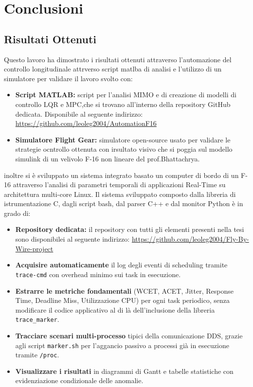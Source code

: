 \chapter{Conclusioni}
\label{ch:conclusioni}

\section{Risultati Ottenuti}
Questo lavoro ha dimostrato i risultati ottenuti attraverso l'automazione del controllo longitudinale attrverso script matlba di analisi e l'utilizzo di un simulatore per validare il lavoro svolto con:


\begin{itemize}
	
	\item \textbf{Script MATLAB:} script per l'analisi MIMO e di creazione di modelli di controllo LQR e MPC,che si trovano all'interno della repository GitHub dedicata. Disponibile al seguente indirizzo: \url{https://github.com/leoleg2004/AutomationF16}
	\item \textbf{Simulatore Flight Gear:} simulatore open-source usato per validare le strategie ocntrollo ottenuta con irsultato visivo che si poggia sul modello simulink di un velivolo F-16 non lineare del prof.Bhattachrya\cite{bhattacharya_f16_trim}.
	
\end{itemize}

inoltre si è sviluppato un sistema integrato basato un computer di bordo di un F-16 attraverso l'analisi di parametri temporali di applicazioni Real-Time su architettura multi-core Linux. Il sistema sviluppato composto dalla libreria di istrumentazione C, dagli script bash, dal parser C++ e dal monitor Python è in grado di:

\begin{itemize}
		\item \textbf{Repository dedicata:} il  repository con tutti gli elementi presenti nella tesi sono disponibilei al seguente indirizzo: \url{https://github.com/leoleg2004/Fly-By-Wire-project}
	\item \textbf{Acquisire automaticamente} il log degli eventi di scheduling tramite \texttt{trace-cmd} con overhead minimo sui task in esecuzione.
	\item \textbf{Estrarre le metriche fondamentali} (WCET, ACET, Jitter, Response Time, Deadline Miss, Utilizzazione CPU) per ogni task periodico, senza modificare il codice applicativo al di là dell'inclusione della libreria \texttt{trace\_marker}.
	\item \textbf{Tracciare scenari multi-processo} tipici della comunicazione DDS, grazie agli script \texttt{marker.sh} per l'aggancio passivo a processi già in esecuzione tramite \texttt{/proc}.
	\item \textbf{Visualizzare i risultati} in diagrammi di Gantt e tabelle statistiche con evidenziazione condizionale delle anomalie.
\end{itemize}

